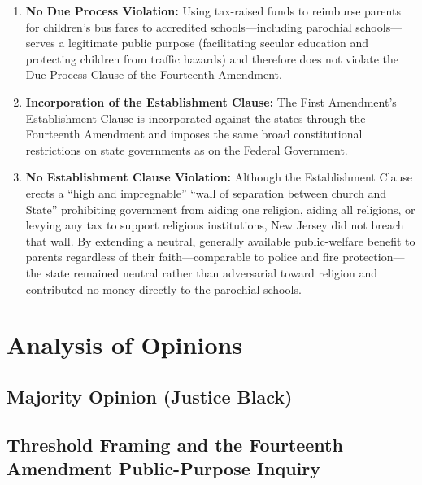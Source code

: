 \documentclass[12pt]{article}
\begin{document}
\begin{enumerate}
  \item \textbf{No Due Process Violation:} Using tax-raised funds to reimburse parents for children's bus fares to accredited schools---including parochial schools---serves a legitimate public purpose (facilitating secular education and protecting children from traffic hazards) and therefore does not violate the Due Process Clause of the Fourteenth Amendment.
  \item \textbf{Incorporation of the Establishment Clause:} The First Amendment's Establishment Clause is incorporated against the states through the Fourteenth Amendment and imposes the same broad constitutional restrictions on state governments as on the Federal Government.
  \item \textbf{No Establishment Clause Violation:} Although the Establishment Clause erects a ``high and impregnable'' ``wall of separation between church and State'' prohibiting government from aiding one religion, aiding all religions, or levying any tax to support religious institutions, New Jersey did not breach that wall. By extending a neutral, generally available public-welfare benefit to parents regardless of their faith---comparable to police and fire protection---the state remained neutral rather than adversarial toward religion and contributed no money directly to the parochial schools.
\end{enumerate}

\section{Analysis of Opinions}
\subsection{Majority Opinion (Justice Black)}

\subsection{Threshold Framing and the Fourteenth Amendment Public-Purpose Inquiry}
\end{document}
